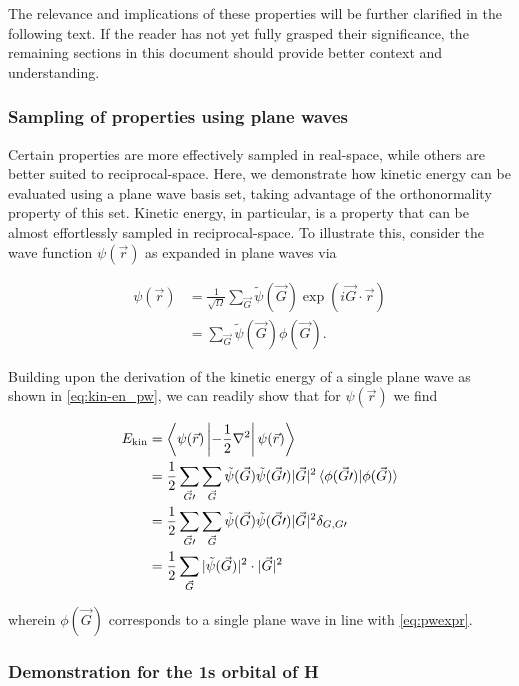 The relevance and implications of these properties will be further clarified in the following text. If the reader has not yet fully grasped their significance, the remaining sections in this document should provide better context and understanding.

%
%
%
\subsubsection{Sampling of properties using plane waves}

Certain properties are more effectively sampled in real-space, while others are better suited to reciprocal-space. Here, we demonstrate how kinetic energy can be evaluated using a plane wave basis set, taking advantage of the orthonormality property of this set. Kinetic energy, in particular, is a property that can be almost effortlessly sampled in reciprocal-space. To illustrate this, consider the wave function $\psi(\vec{r})$ as expanded in plane waves via

\begin{align}
    \psi(\vec{r}) &= \frac{1}{\sqrt{\Omega}} \sum_{\vec{G}} \tilde{\psi}(\vec{G}) \exp \left(i \vec{G} \cdot \vec{r} \right) \\
    &= \sum_{\vec{G}} \tilde{\psi}(\vec{G}) \phi(\vec{G}).
\end{align}

Building upon the derivation of the kinetic energy of a single plane wave as shown in \cref{eq:kin-en_pw}, we can readily show that for $\psi(\vec{r})$ we find

\begin{align}
    E_{\text{kin}} &= \left<\psi(\vec{r})\left|-\frac{1}{2}\nabla^{2}\right|\psi(\vec{r})\right> \\
    &= \frac{1}{2} \sum_{\vec{G}\prime}\sum_{\vec{G}} \tilde{\psi}(\vec{G}) \tilde{\psi}(\vec{G}\prime) |\vec{G}|^{2} \braket{\phi(\vec{G}\prime)|\phi(\vec{G})} \\
    &= \frac{1}{2} \sum_{\vec{G}\prime}\sum_{\vec{G}} \tilde{\psi}(\vec{G}) \tilde{\psi}(\vec{G}\prime) |\vec{G}|^{2} \delta_{G,G\prime} \\
    &=\frac{1}{2}\sum_{\vec{G}} |\tilde{\psi}(\vec{G})|^{2} \cdot |\vec{G}|^{2}
    \label{eq:kin_en}
\end{align}

wherein $\phi(\vec{G})$ corresponds to a single plane wave in line with \cref{eq:pwexpr}.

%
%
%
\subsubsection{Demonstration for the 1s orbital of H}

